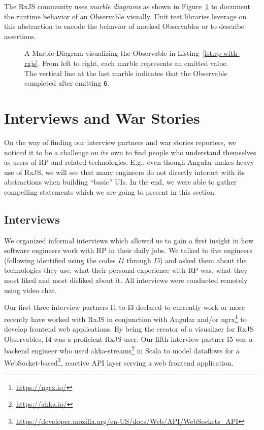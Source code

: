 \documentclass[12pt,a4paper]{article}
\begin{document}
The RxJS community uses \emph{marble diagrams} as shown in Figure~\ref{fig:marble-diagram} to document \cite{marblediagrams} the runtime behavior of an Observable visually. Unit test libraries\cite{marbletesting} leverage on this abstraction to encode the behavior of mocked Observables or to describe assertions.

\begin{figure}[H]
	\centering
	\caption{A Marble Diagram visualizing the Observable in Listing~\ref{lst:rp-with-rxjs}. From left to right, each marble represents an emitted value. The vertical line at the last marble indicates that the Observable completed after emitting \texttt{6}.}
	\label{fig:marble-diagram}
\end{figure}


\section{Interviews and War Stories}
\label{sec:interviews}

On the way of finding our interview partners and war stories reporters, we noticed it to be a challenge on its own to find people who understand themselves as users of RP and related technologies. E.g., even though Angular makes heavy use of RxJS, we will see that many engineers do not directly interact with its abstractions when building ``basic'' UIs. In the end, we were able to gather compelling statements which we are going to present in this section.

\subsection{Interviews}

We organized informal interviews which allowed us to gain a first insight in how software engineers work with RP in their daily jobs. We talked to five engineers (following identified using the codes \emph{I1} through \emph{I5}) and asked them about the technologies they use, what their personal experience with RP was, what they most liked and most disliked about it. All interviews were conducted remotely using video chat.

Our first three interview partners I1 to I3 declared to currently work or more recently have worked with RxJS in conjunction with Angular and/or ngrx\footnote{\url{https://ngrx.io/}} to develop frontend web applications. By being the creator of a visualizer for RxJS Observables, I4 was a proficient RxJS user. Our fifth interview partner I5 was a backend engineer who used akka-streams\footnote{\url{https://akka.io/}} in Scala to model dataflows for a WebSocket-based\footnote{\url{https://developer.mozilla.org/en-US/docs/Web/API/WebSockets_API}}, reactive API layer serving a web frontend application.
\end{document}
